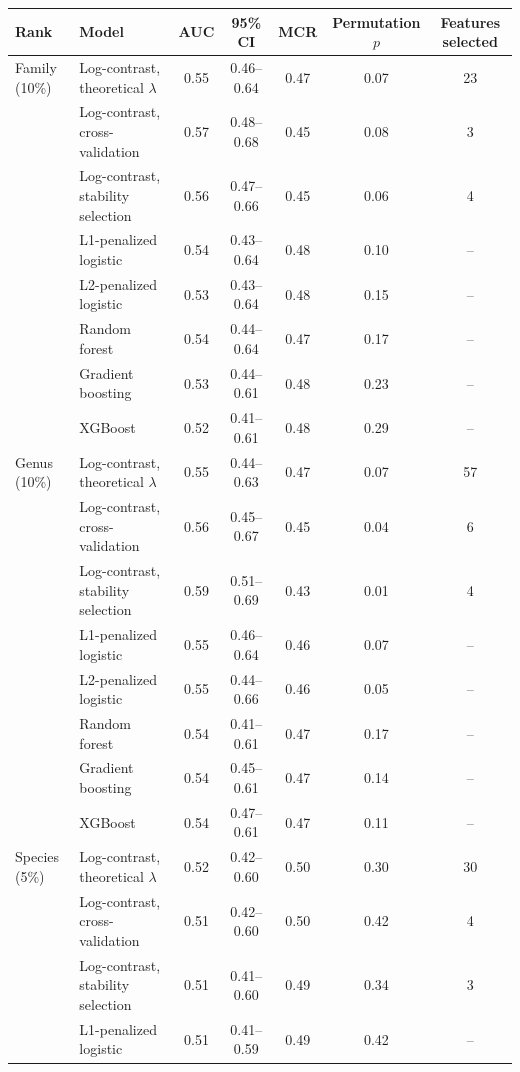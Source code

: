 \begin{table}[h!]
\centering
\footnotesize
\setlength{\tabcolsep}{4pt}
\begin{tabular}{l l c c c c c}
\textbf{Rank} & \textbf{Model} & \textbf{AUC} & \textbf{95\% CI} & \textbf{MCR} & \textbf{Permutation $p$} & \textbf{Features selected} \\
\hline
Family (10\%) & Log-contrast, theoretical $\lambda$ & 0.55 & 0.46--0.64 & 0.47 & 0.07 & 23 \\
 & Log-contrast, cross-validation & 0.57 & 0.48--0.68 & 0.45 & 0.08 & 3 \\
 & Log-contrast, stability selection & 0.56 & 0.47--0.66 & 0.45 & 0.06 & 4 \\
 & L1-penalized logistic & 0.54 & 0.43--0.64 & 0.48 & 0.10 & -- \\
 & L2-penalized logistic & 0.53 & 0.43--0.64 & 0.48 & 0.15 & -- \\
 & Random forest & 0.54 & 0.44--0.64 & 0.47 & 0.17 & -- \\
 & Gradient boosting & 0.53 & 0.44--0.61 & 0.48 & 0.23 & -- \\
 & XGBoost & 0.52 & 0.41--0.61 & 0.48 & 0.29 & -- \\
\hline
Genus (10\%) & Log-contrast, theoretical $\lambda$ & 0.55 & 0.44--0.63 & 0.47 & 0.07 & 57 \\
 & Log-contrast, cross-validation & 0.56 & 0.45--0.67 & 0.45 & 0.04 & 6 \\
 & Log-contrast, stability selection & 0.59 & 0.51--0.69 & 0.43 & 0.01 & 4 \\
 & L1-penalized logistic & 0.55 & 0.46--0.64 & 0.46 & 0.07 & -- \\
 & L2-penalized logistic & 0.55 & 0.44--0.66 & 0.46 & 0.05 & -- \\
 & Random forest & 0.54 & 0.41--0.61 & 0.47 & 0.17 & -- \\
 & Gradient boosting & 0.54 & 0.45--0.61 & 0.47 & 0.14 & -- \\
 & XGBoost & 0.54 & 0.47--0.61 & 0.47 & 0.11 & -- \\
\hline
Species (5\%) & Log-contrast, theoretical $\lambda$ & 0.52 & 0.42--0.60 & 0.50 & 0.30 & 30 \\
 & Log-contrast, cross-validation & 0.51 & 0.42--0.60 & 0.50 & 0.42 & 4 \\
 & Log-contrast, stability selection & 0.51 & 0.41--0.60 & 0.49 & 0.34 & 3 \\
 & L1-penalized logistic & 0.51 & 0.41--0.59 & 0.49 & 0.42 & -- \\

\end{tabular}
\end{table}
